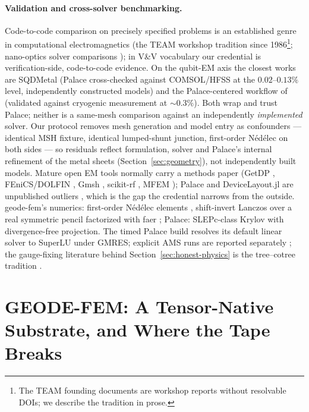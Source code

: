 \documentclass{anvil-paper}
\begin{document}
\paragraph{Validation and cross-solver benchmarking.}
Code-to-code comparison on precisely specified problems is an established
genre in computational electromagnetics (the TEAM workshop tradition
since 1986\footnote{The TEAM founding documents are workshop reports
without resolvable DOIs; we describe the tradition in prose.}; nano-optics
solver comparisons \citep{hoffmann2009comparison}); in V\&V vocabulary
\citep{roache1997quantification,oberkampf2010verification} our credential
is verification-side, code-to-code evidence. On the qubit-EM axis the
closest works are SQDMetal \citep{sommers2025open} (Palace cross-checked
against COMSOL/HFSS at the $0.02$--$0.13\%$ level, independently
constructed models) and the Palace-centered workflow of
\citet{ye2025electromagnetic} (validated against cryogenic measurement at
${\sim}0.3\%$). Both wrap and trust Palace; neither is a same-mesh
comparison against an independently \emph{implemented} solver. Our
protocol removes mesh generation and model entry as confounders ---
identical MSH fixture, identical lumped-shunt junction, first-order
N\'ed\'elec on both sides --- so residuals reflect formulation, solver
and Palace's internal refinement of the metal sheets
(Section~\ref{sec:geometry}), not independently built models.
Mature open EM tools normally carry a methods paper (GetDP
\citep{dular1998general}, FEniCS/DOLFIN \citep{logg2010dolfin}, Gmsh
\citep{gmsh}, scikit-rf \citep{arsenovic2022scikit}, MFEM
\citep{mfem}); Palace and DeviceLayout.jl are unpublished outliers
\citep{palace,palace-blog,devicelayout,devicelayout-blog,
devicelayout-juliacon}, which is the gap the credential narrows from the
outside. geode-fem's numerics: first-order N\'ed\'elec elements
\citep{nedelec1980}, shift-invert Lanczos \citep{arpack} over a real
symmetric pencil factorized with faer \citep{kazdadi2026faer}; Palace:
SLEPc-class Krylov \citep{slepc} with divergence-free projection.
The timed Palace build resolves its default linear solver to SuperLU
under GMRES; explicit AMS runs are reported separately
\citep{hiptmair-xu,tzaniovkolevpanayotsvassilevski2018parallel}; the gauge-fixing literature
behind Section~\ref{sec:honest-physics} is the tree--cotree tradition
\citep{albanese1988solution,manges1995generalized}.

\section{GEODE-FEM: A Tensor-Native Substrate, and Where the Tape Breaks}
\label{sec:architecture}
\end{document}
